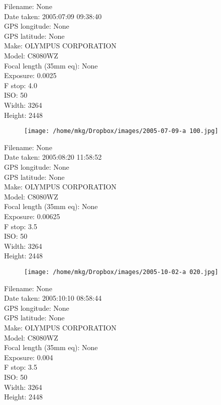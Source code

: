 \clearpage
\recalctypearea
\newpage
\noindent
Filename: None\\ 
Date taken: 2005:07:09 09:38:40\\ 
GPS longitude: None\\ 
GPS latitude: None\\ 
Make: OLYMPUS CORPORATION\\ 
Model: C8080WZ\\ 
Focal length (35mm eq): None\\ 
Exposure: 0.0025\\ 
F stop: 4.0\\ 
ISO: 50\\ 
Width: 3264\\ 
Height: 2448\\ 

\clearpage
\recalctypearea
\newpage
\noindent
\begin{figure}
    \texttt{[image: /home/mkg/Dropbox/images/2005-07-09-a 100.jpg]}
    \captionlistentry[figure]{\url{\protect\detokenize{}}}
\end{figure}

\clearpage
\recalctypearea
\newpage
\noindent
Filename: None\\ 
Date taken: 2005:08:20 11:58:52\\ 
GPS longitude: None\\ 
GPS latitude: None\\ 
Make: OLYMPUS CORPORATION\\ 
Model: C8080WZ\\ 
Focal length (35mm eq): None\\ 
Exposure: 0.00625\\ 
F stop: 3.5\\ 
ISO: 50\\ 
Width: 3264\\ 
Height: 2448\\ 

\clearpage
\recalctypearea
\newpage
\noindent
\begin{figure}
    \texttt{[image: /home/mkg/Dropbox/images/2005-10-02-a 020.jpg]}
    \captionlistentry[figure]{\url{\protect\detokenize{}}}
\end{figure}

\clearpage
\recalctypearea
\newpage
\noindent
Filename: None\\ 
Date taken: 2005:10:10 08:58:44\\ 
GPS longitude: None\\ 
GPS latitude: None\\ 
Make: OLYMPUS CORPORATION\\ 
Model: C8080WZ\\ 
Focal length (35mm eq): None\\ 
Exposure: 0.004\\ 
F stop: 3.5\\ 
ISO: 50\\ 
Width: 3264\\ 
Height: 2448\\ 

